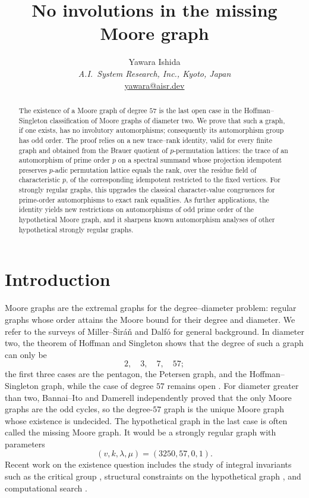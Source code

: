 \documentclass[11pt]{article}
\title{No involutions in the missing Moore graph}
\author{Yawara Ishida\\[3pt]
  {\small\normalfont\itshape A.I.\ System Research, Inc., Kyoto, Japan}\\[2pt]
  {\small\normalfont\texorpdfstring{\href{mailto:yawara@aisr.dev}{yawara@aisr.dev}}{yawara@aisr.dev}}}
\date{}
\theoremstyle{plain}
\theoremstyle{remark}
\begin{document}
\maketitle

\begin{abstract}
The existence of a Moore graph of degree $57$ is the last open case in the Hoffman--Singleton classification of Moore graphs of diameter two.
We prove that such a graph, if one exists, has no involutory automorphisms; consequently its automorphism group has odd order.
The proof relies on a new trace--rank identity,
valid for every finite graph and obtained from the Brauer quotient of $p$-permutation lattices:
the trace of an automorphism of prime order $p$ on a spectral summand whose projection idempotent preserves $p$-adic permutation lattice equals
the rank, over the residue field of characteristic $p$, of the corresponding idempotent restricted to the fixed vertices.
For strongly regular graphs,
this upgrades the classical character-value congruences for prime-order automorphisms to exact rank equalities.
As further applications, the identity yields new restrictions on automorphisms of odd prime order of the hypothetical Moore graph,
and it sharpens known automorphism analyses of other hypothetical strongly regular graphs.
\end{abstract}

\section{Introduction}

Moore graphs are the extremal graphs for the degree--diameter problem: regular graphs whose order attains the Moore bound for their degree and diameter.
We refer to the surveys of Miller--\v{S}ir\'a\v{n} \cite{MillerSiran} and Dalf\'o \cite{Dalfo} for general background.
In diameter two, the theorem of Hoffman and Singleton shows that the degree of such a graph can only be
\[
 2,\quad 3,\quad 7,\quad 57;
\]
the first three cases are the pentagon, the Petersen graph, and the Hoffman--Singleton graph,
while the case of degree $57$ remains open \cite{HoffmanSingleton}.
For diameter greater than two,
Bannai--Ito \cite{BannaiIto} and Damerell \cite{Damerell} independently proved that the only Moore graphs are the odd cycles,
so the degree-$57$ graph is the unique Moore graph whose existence is undecided.
The hypothetical graph in the last case is often called the missing Moore graph.
It would be a strongly regular graph with parameters \cite{HoffmanSingleton,BrouwerHaemers}
\[
 (v,k,\lambda,\mu)=(3250,57,0,1).
\]
Recent work on the existence question includes the study of integral invariants such as the critical group \cite{Ducey},
structural constraints on the hypothetical graph \cite{Renteln,RentelnCorrigendum},
and computational search \cite{SmithMontemanni2023,SmithMontemanni2024,SmithMontemanni2026}.
\end{document}
